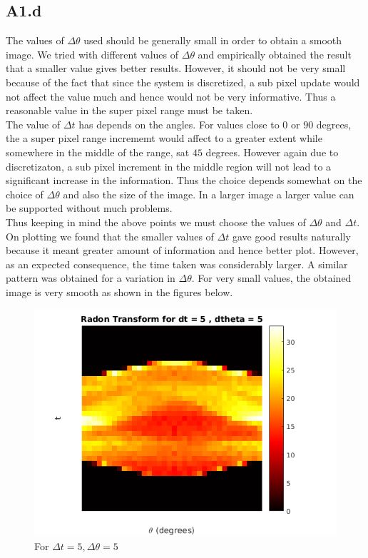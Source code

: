 \documentclass{article}
\begin{document}
\subsection*{A1.d}
The values of $ \Delta \theta $ used should be generally small in order to obtain a smooth image. We tried with different values of $ \Delta \theta $ and empirically obtained the result that a smaller value gives better results. However, it should not be very small because of the fact that since the system is discretized, a sub pixel update would not affect the value much and hence would not be very informative. Thus a reasonable value in the super pixel range must be taken. \\

The value of $ \Delta t $ has depends on the angles. For values close to $0$ or $90$ degrees, the a super pixel range incrememt would affect to a greater extent while somewhere in the middle of the range, sat $45$ degrees. However again due to discretizaton, a sub pixel increment in the middle region will not lead to a significant increase in the information. Thus the choice depends somewhat on the choice of $ \Delta \theta $ and also the size of the image. In a larger image a larger value can be supported without much problems. \\

Thus keeping in mind the above points we must choose the values of $ \Delta \theta $ and $ \Delta t $. \\

On plotting we found that the smaller values of $\Delta t $ gave good results naturally because it meant greater amount of information and hence better plot. However, as an expected consequence, the time taken was considerably larger. A similar pattern was obtained for a variation in $\Delta \theta$. For very small values, the obtained image is very smooth as shown in the figures below.

\begin{figure}[h]
	\centering
	\includegraphics[scale = 0.5]{code/html/myRadonTrans_05.png}
	\caption{For $\Delta t = 5, \Delta \theta =5 $}
	\label{Fig :1d1}
\end{figure}
\end{document}
